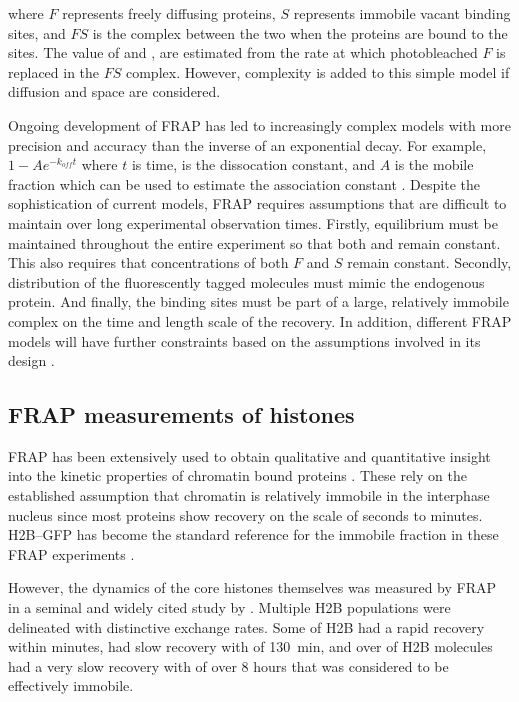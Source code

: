     where $F$ represents freely diffusing proteins,
    $S$ represents immobile vacant binding sites,
    and $FS$ is the complex between the two when the
    proteins are bound to the sites.
    The value of \kon{} and \koff{},
    are estimated from the rate at which photobleached $F$
    is replaced in the $FS$ complex.
    However, complexity is added to this simple model if
    diffusion and space are considered.

    Ongoing development of FRAP has led to increasingly complex models
    with more precision and accuracy than the inverse of an
    exponential decay.  For example, $1 - Ae^{-k_{off}t}$ where
    $t$ is time, \koff{} is the dissocation constant, and $A$ is the
    mobile fraction which can be used to estimate the association
    constant \kon{} \citep{mcnally-frap-2010}.
    Despite the sophistication of current models, FRAP requires assumptions
    that are difficult to maintain over long experimental observation times.
    Firstly, equilibrium must be maintained throughout the entire experiment
    so that both \kon{} and \koff{} remain constant.
    This also requires that concentrations of both $F$ and $S$ remain constant.
    Secondly, distribution of the fluorescently tagged molecules
    must mimic the endogenous protein.
    And finally, the binding sites must be part of a large,
    relatively immobile complex
    on the time and length scale of the recovery.
    In addition, different FRAP models will have further constraints
    based on the assumptions involved in its design \citep{mcnally-frap-2010}.

  \subsection{FRAP measurements of histones}

    FRAP has been extensively used to obtain qualitative and
    quantitative insight into the kinetic properties of chromatin bound
    proteins \citep{phair2000high, essers2005nuclear, agresti2005gr}.
    These rely on the established assumption that chromatin is
    relatively immobile in the interphase nucleus
    \citep{abney1997chromatin} since most proteins show recovery
    on the scale of seconds to minutes.
    H2B--GFP \citep{KevinH2BGFP} has become
    the standard reference for the immobile fraction in these
    FRAP experiments \citep{dey2000bromodomain, kuipers2011highly,
    jullien2016chromatibody}.

    However, the dynamics of the core histones themselves
    was measured by FRAP in a seminal
    and widely cited study by \citet{KimuraCook}. Multiple H2B
    populations were delineated with distinctive exchange rates.  Some
     of H2B had a rapid recovery within minutes, 
    had slow recovery with \halflife[] of \SI{130}{\minute},
    and over  of H2B molecules had a
    very slow recovery with \halflife[] of
    over 8 hours that was considered to be effectively immobile.

